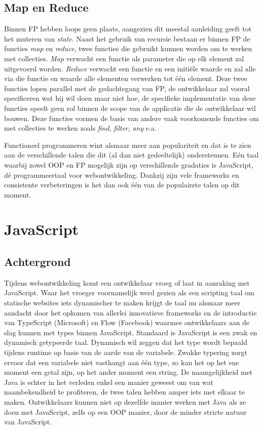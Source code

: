 \subsection{Map en Reduce}
Binnen FP hebben loops geen plaats, aangezien dit meestal aanleiding geeft tot het muteren van \textit{state}. Naast het gebruik van recursie bestaan er binnen FP de functies \textit{map} en \textit{reduce}, twee functies die gebruikt kunnen worden om te werken met collecties. \textit{Map} verwacht een functie als parameter die op elk element zal uitgevoerd worden. \textit{Reduce} verwacht een functie en een initiële waarde en zal alle via die functie en waarde alle elementen verwerken tot één element. Deze twee functies lopen parallel met de gedachtegang van FP, de ontwikkelaar zal vooral specificeren wat hij wil doen maar niet hoe, de specifieke implementatie van deze functies speelt geen rol binnen de scope van de applicatie die de ontwikkelaar wil bouwen. Deze functies vormen de basis van andere vaak voorkomende functies om met collecties te werken zoals \textit{find}, \textit{filter}, \textit{any} e.a.

Functioneel programmeren wint alsmaar meer aan populariteit en dat is te zien aan de verschillende talen die dit (al dan niet gedeeltelijk) ondersteunen. Eén taal waarbij zowel OOP en FP mogelijk zijn op verschillende gradaties is JavaScript, dé programmeertaal voor webontwikkeling. Dankzij zijn vele frameworks en consistente verbeteringen is het dan ook één van de populairste talen op dit moment.

\section{JavaScript}
\subsection{Achtergrond}
Tijdens webontwikkeling komt een ontwikkelaar vroeg of laat in aanraking met JavaScript. Waar het vroeger voornamelijk werd gezien als een scripting taal om statische websites iets dynamischer te maken krijgt de taal nu alsmaar meer aandacht door het opkomen van allerlei innovatieve frameworks en de introductie van TypeScript (Microsoft) en Flow (Facebook) waarmee ontwikkelaars aan de slag kunnen met types binnen JavaScript. Standaard is JavaScript is een zwak en dynamisch getypeerde taal. Dynamisch wil zeggen dat het type wordt bepaald tijdens runtime op basis van de aarde van de variabele. Zwakke typering zorgt ervoor dat een variabele niet vasthangt aan één type, zo kan het op het ene moment een getal zijn, op het ander moment een string. De naamgelijkheid met Java is echter in het verleden enkel een manier geweest om van wat naambekendheid te profiteren, de twee talen hebben amper iets met elkaar te maken. Ontwikkelaars kunnen niet op dezelfde manier werken met Java als ze doen met JavaScript, zelfs op een OOP manier, door de minder stricte natuur van JavaScript. 

